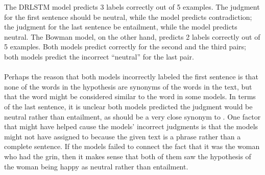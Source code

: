 \documentclass[12pt,letterpaper]{article}
\begin{document}
The DRLSTM model predicts 3 labels correctly out of 5 examples. The judgment for the first sentence should be neutral, while the model predicts contradiction; the judgment for the last sentence be entailment, while the model predicts neutral. The Bowman model, on the other hand, predicts 2 labels correctly out of 5 examples. Both models predict correctly for the second and the third pairs; both models predict the incorrect “neutral” for the last pair. \\
\\
Perhaps the reason that both models incorrectly labeled the first sentence is that none of the words in the hypothesis are synonyms of the words in the text, but that the word  might be considered similar to the word  in some models. In terms of the last sentence, it is unclear both models predicted the judgment would be neutral rather than entailment, as  should be a very close synonym to . One factor that might have helped cause the models' incorrect judgments is that the models might not have assigned  to  because the given text is a phrase rather than a complete sentence. If the models failed to connect the fact that it was the woman who had the grin, then it makes sense that both of them saw the hypothesis of the woman being happy as neutral rather than entailment.
\end{document}
